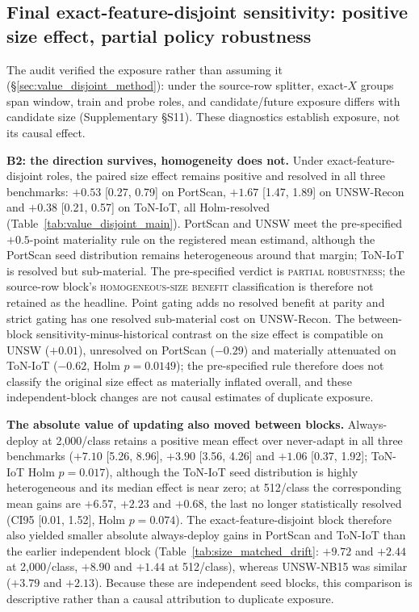 \documentclass[journal]{IEEEtran}
\begin{document}
\subsection{Final exact-feature-disjoint sensitivity: positive size effect, partial policy robustness}
\label{sec:value_disjoint}

The audit verified the exposure rather than assuming it (\S\ref{sec:value_disjoint_method}): under the source-row splitter, exact-$X$ groups span window, train and probe roles, and candidate/future exposure differs with candidate size (Supplementary \S S11). These diagnostics establish exposure, not its causal effect.



\textbf{B2: the direction survives, homogeneity does not.} Under exact-feature-disjoint roles, the paired size effect remains positive and resolved in all three benchmarks: $+0.53$ [0.27, 0.79] on PortScan, $+1.67$ [1.47, 1.89] on UNSW-Recon and $+0.38$ [0.21, 0.57] on ToN-IoT, all Holm-resolved (Table~\ref{tab:value_disjoint_main}). PortScan and UNSW meet the pre-specified $+0.5$-point materiality rule on the registered mean estimand, although the PortScan seed distribution remains heterogeneous around that margin; ToN-IoT is resolved but sub-material. The pre-specified verdict is \textsc{partial robustness}; the source-row block's \textsc{homogeneous-size benefit} classification is therefore not retained as the headline. Point gating adds no resolved benefit at parity and strict gating has one resolved sub-material cost on UNSW-Recon. The between-block sensitivity-minus-historical contrast on the size effect is compatible on UNSW ($+0.01$), unresolved on PortScan ($-0.29$) and materially attenuated on ToN-IoT ($-0.62$, Holm $p=0.0149$); the pre-specified rule therefore does not classify the original size effect as materially inflated overall, and these independent-block changes are not causal estimates of duplicate exposure.

\textbf{The absolute value of updating also moved between blocks.} Always-deploy at 2{,}000/class retains a positive mean effect over never-adapt in all three benchmarks ($+7.10$ [5.26, 8.96], $+3.90$ [3.56, 4.26] and $+1.06$ [0.37, 1.92]; ToN-IoT Holm $p=0.017$), although the ToN-IoT seed distribution is highly heterogeneous and its median effect is near zero; at 512/class the corresponding mean gains are $+6.57$, $+2.23$ and $+0.68$, the last no longer statistically resolved (CI95 [0.01, 1.52], Holm $p=0.074$). The exact-feature-disjoint block therefore also yielded smaller absolute always-deploy gains in PortScan and ToN-IoT than the earlier independent block (Table~\ref{tab:size_matched_drift}: $+9.72$ and $+2.44$ at 2{,}000/class, $+8.90$ and $+1.44$ at 512/class), whereas UNSW-NB15 was similar ($+3.79$ and $+2.13$). Because these are independent seed blocks, this comparison is descriptive rather than a causal attribution to duplicate exposure.
\end{document}
